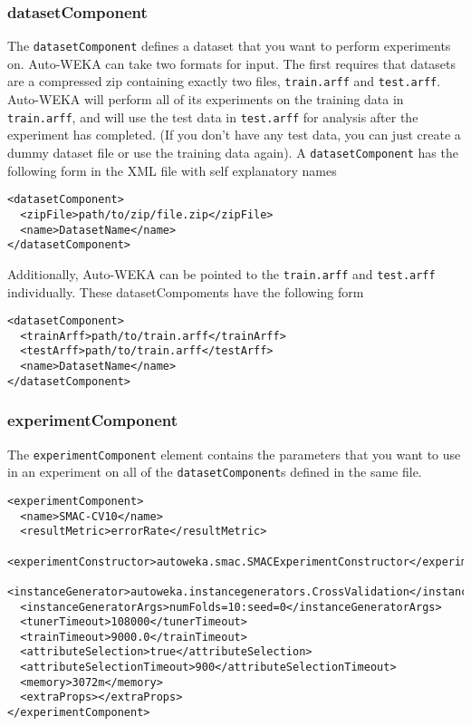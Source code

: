 \subsubsection{datasetComponent}

The \texttt{datasetComponent} defines a dataset that you want to perform experiments on. Auto-WEKA can take two formats for input. The first requires that datasets are a compressed zip containing exactly two files, \texttt{train.arff} and \texttt{test.arff}. Auto-WEKA will perform all of its experiments on the training data in \texttt{train.arff}, and will use the test data in \texttt{test.arff} for analysis after the experiment has completed. (If you don't have any test data, you can just create a dummy dataset file or use the training data again). A \texttt{datasetComponent} has the following form in the XML file with self explanatory names

\begin{verbatim}
<datasetComponent>
  <zipFile>path/to/zip/file.zip</zipFile>
  <name>DatasetName</name>
</datasetComponent>
\end{verbatim}

Additionally, Auto-WEKA can be pointed to the \texttt{train.arff} and \texttt{test.arff} individually. These datasetCompoments have the following form

\begin{verbatim}
<datasetComponent>
  <trainArff>path/to/train.arff</trainArff>
  <testArff>path/to/train.arff</testArff>
  <name>DatasetName</name>
</datasetComponent>
\end{verbatim}

\subsubsection{experimentComponent}\label{sec:experimentdefs:excomp}

The \texttt{experimentComponent} element contains the parameters that you want to use in an experiment on all of the \texttt{datasetComponent}s defined in the same file. 

\begin{verbatim}
<experimentComponent>
  <name>SMAC-CV10</name>
  <resultMetric>errorRate</resultMetric>
  <experimentConstructor>autoweka.smac.SMACExperimentConstructor</experimentConstructor>
  <instanceGenerator>autoweka.instancegenerators.CrossValidation</instanceGenerator>
  <instanceGeneratorArgs>numFolds=10:seed=0</instanceGeneratorArgs>
  <tunerTimeout>108000</tunerTimeout>
  <trainTimeout>9000.0</trainTimeout>
  <attributeSelection>true</attributeSelection>
  <attributeSelectionTimeout>900</attributeSelectionTimeout>
  <memory>3072m</memory>
  <extraProps></extraProps>
</experimentComponent>
\end{verbatim}
    

